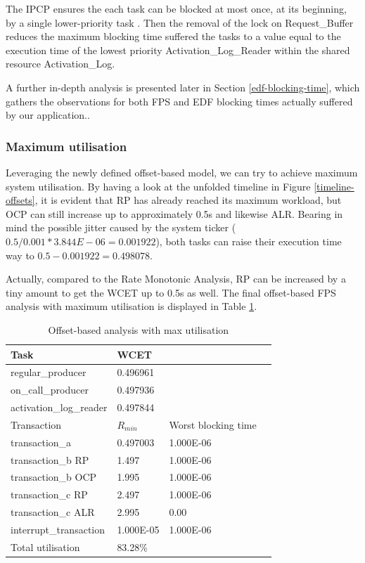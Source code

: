 \documentclass{article}
\begin{document}
The IPCP ensures the each task can be blocked at most once, at its beginning, by a single lower-priority task \cite{ada-pcp}. Then the removal of the lock on Request\_Buffer reduces the maximum blocking time suffered the tasks to a value equal to the execution time of the lowest priority Activation\_Log\_Reader within the shared resource Activation\_Log.

A further in-depth analysis is presented later in Section \ref{edf-blocking-time}, which gathers the observations for both FPS and EDF blocking times actually suffered by our application..

\subsubsection{Maximum utilisation} \label{maximum-utilisation}

Leveraging the newly defined offset-based model, we can try to achieve maximum system utilisation. By having a look at the unfolded timeline in Figure \ref{timeline-offsets}, it is evident that RP has already reached its maximum workload, but OCP can still increase up to approximately 0.5s and likewise ALR. Bearing in mind the possible jitter caused by the system ticker ($0.5 / 0.001 * 3.844E-06 = 0.001922$), both tasks can raise their execution time way to $0.5 - 0.001922 = 0.498078$.

Actually, compared to the Rate Monotonic Analysis, RP can be increased by a tiny amount to get the WCET up to 0.5s as well. The final offset-based FPS analysis with maximum utilisation is displayed in Table \ref{tab:off-approx-w-pr-max-utilisation}.

\begin{table}[!htbp]
   \centering
   \begin{tabular}{llll}
    \toprule
    Task & WCET \\
    \midrule
    regular\_producer & 0.496961 \\
    on\_call\_producer & 0.497936 \\
    activation\_log\_reader & 0.497844 \\
    \toprule
    \toprule
    Transaction & $R_{min}$ & Worst blocking time \\
    \midrule
    transaction\_a & 0.497003 &  1.000E-06 \\
    transaction\_b RP & 1.497 & 1.000E-06 \\
    transaction\_b OCP & 1.995 & 1.000E-06 \\
    transaction\_c RP & 2.497 & 1.000E-06 \\
    transaction\_c ALR & 2.995 & 0.00 \\
    interrupt\_transaction & 1.000E-05 & 1.000E-06 \\
    \toprule
    \toprule
    Total utilisation & 83.28\% \\
   \end{tabular}
   \caption{Offset-based analysis with max utilisation}
   \label{tab:off-approx-w-pr-max-utilisation}
 \end{table}
\end{document}
